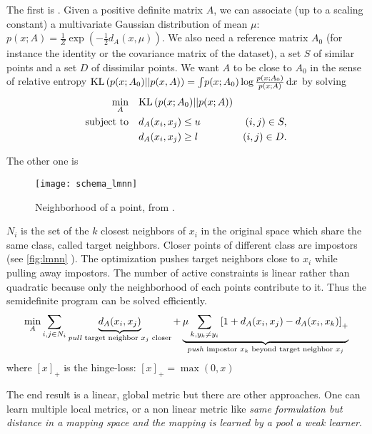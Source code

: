 The first is  \autocite{InfoMetric07}. Given a positive definite matrix $A$, we can associate (up to a scaling constant) a multivariate Gaussian distribution of mean $\mu$: $p(x; A) = \frac{1}{Z}\exp\left(-\frac{1}{2}d_A(x, \mu)\right)$. We also need a reference matrix $A_0$ (for instance the identity or the covariance matrix of the dataset), a set $S$ of similar points and a set $D$ of dissimilar points. We want $A$ to be close to $A_0$ in the sense of relative entropy $\mathrm{KL}\left(p(x; A_0)||p(x,A)\right) = \int \! p(x; A_0) \log\frac{p(x; A_0)}{p(x; A)}\, \mathrm{d}x$ by solving
\begin{align*}
        \min_A &\quad \mathrm{KL}\left(p(x; A_0)||p(x; A)\right) &\quad\\
        \text{subject to} &\quad d_A(x_i, x_j) \leq u &(i,j) \in S,\\
                       &\quad d_A(x_i, x_j) \geq l &(i,j) \in D.
\end{align*}

The other one is  \autocite{LMNN09}
\begin{figure}[ht]
        \texttt{[image: schema\_lmnn]}
        \caption{Neighborhood of a point, from \autocite{LMNN09}.\label{fig:lmnn}}
\end{figure}
$N_i$ is the set of the $k$ closest neighbors of $x_i$ in the original space which share the same class, called target neighbors. Closer points of different class are impostors (see \autoref{fig:lmnn} ). The optimization pushes target neighbors close to $x_i$ while pulling away impostors.  The number of active constraints is linear rather than quadratic because only the neighborhood of each points contribute to it. Thus the semidefinite program can be solved efficiently.
\begin{equation}
        \min_A \sum_{i, j\in N_i} \underbrace{d_A(x_i, x_j)}_\text{\emph{pull} target neighbor $x_j$ closer}
        + \underbrace{\mu \sum_{k, y_k\neq y_i} \left[ 1 + d_A(x_i, x_j) - d_A(x_i, x_k)\right]_+}_\text{\emph{push} impostor $x_k$ beyond target neighbor $x_j$}
\end{equation}
where $[x]_+$ is the hinge-loss: $[x]_+=\max(0, x)$

The end result is a linear, global metric but there are other approaches. One can learn multiple local metrics, or a non linear metric like  \autocite{GBLMNN11} \emph{same formulation but distance in a mapping space and the mapping is learned by a pool a weak learner}.


